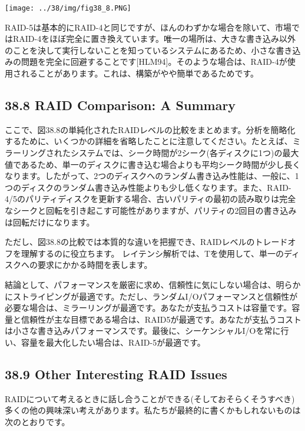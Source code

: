 \texttt{[image: ../38/img/fig38\_8.PNG]}

RAID-5は基本的にRAID-4と同じですが、ほんのわずかな場合を除いて、市場ではRAID-4をほぼ完全に置き換えています。唯一の場所は、大きな書き込み以外のことを決して実行しないことを知っているシステムにあるため、小さな書き込みの問題を完全に回避することです{[}HLM94{]}。そのような場合は、RAID-4が使用されることがあります。これは、構築がやや簡単であるためです。

\hypertarget{raid-comparison-a-summary}{%
\subsection*{38.8 RAID Comparison: A
Summary}\label{raid-comparison-a-summary}}

ここで、図38.8の単純化されたRAIDレベルの比較をまとめます。分析を簡略化するために、いくつかの詳細を省略したことに注意してください。たとえば、ミラーリングされたシステムでは、シーク時間が2シーク(各ディスクに1つ)の最大値であるため、単一のディスクに書き込む場合よりも平均シーク時間が少し長くなります。したがって、2つのディスクへのランダム書き込み性能は、一般に、1つのディスクのランダム書き込み性能よりも少し低くなります。また、RAID-4/5のパリティディスクを更新する場合、古いパリティの最初の読み取りは完全なシークと回転を引き起こす可能性がありますが、パリティの2回目の書き込みは回転だけになります。

ただし、図38.8の比較では本質的な違いを把握でき、RAIDレベルのトレードオフを理解するのに役立ちます。
レイテンシ解析では、Tを使用して、単一のディスクへの要求にかかる時間を表します。

結論として、パフォーマンスを厳密に求め、信頼性に気にしない場合は、明らかにストライピングが最適です。ただし、ランダムI/Oパフォーマンスと信頼性が必要な場合は、ミラーリングが最適です。あなたが支払うコストは容量です。容量と信頼性が主な目標である場合は、RAID5が最適です。あなたが支払うコストは小さな書き込みパフォーマンスです。最後に、シーケンシャルI/Oを常に行い、容量を最大化したい場合は、RAID-5が最適です。

\hypertarget{other-interesting-raid-issues}{%
\subsection*{38.9 Other Interesting RAID
Issues}\label{other-interesting-raid-issues}}

RAIDについて考えるときに話し合うことができる(そしておそらくそうすべき)多くの他の興味深い考えがあります。私たちが最終的に書くかもしれないものは次のとおりです。

